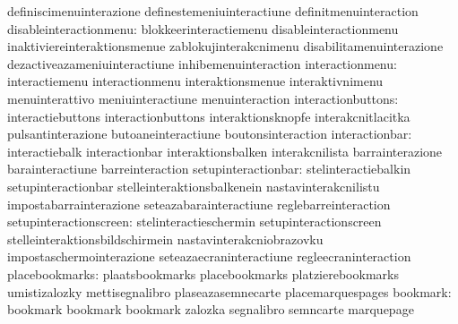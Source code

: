                                   definiscimenuinterazione         definestemeniuinteractiune
                                  definitmenuinteraction
          disableinteractionmenu: blokkeerinteractiemenu           disableinteractionmenu
                                  inaktiviereinteraktionsmenue     zablokujinterakcnimenu
                                  disabilitamenuinterazione        dezactiveazameniuinteractiune
                                  inhibemenuinteraction
                 interactionmenu: interactiemenu                   interactionmenu
                                  interaktionsmenue                interaktivnimenu
                                  menuinterattivo                  meniuinteractiune
                                  menuinteraction
              interactionbuttons: interactiebuttons                interactionbuttons
                                  interaktionsknopfe               interakcnitlacitka
                                  pulsantinterazione               butoaneinteractiune
                                  boutonsinteraction
                  interactionbar: interactiebalk                   interactionbar
                                  interaktionsbalken               interakcnilista
                                  barrainterazione                 barainteractiune
                                  barreinteraction
             setupinteractionbar: stelinteractiebalkin             setupinteractionbar
                                  stelleinteraktionsbalkenein      nastavinterakcnilistu
                                  impostabarrainterazione          seteazabarainteractiune
                                  reglebarreinteraction
          setupinteractionscreen: stelinteractieschermin           setupinteractionscreen
                                  stelleinteraktionsbildschirmein  nastavinterakcniobrazovku
                                  impostaschermointerazione        seteazaecraninteractiune
                                  regleecraninteraction
                  placebookmarks: plaatsbookmarks                  placebookmarks
                                  platzierebookmarks               umistizalozky
                                  mettisegnalibro                  plaseazasemnecarte
                                  placemarquespages
                        bookmark: bookmark                         bookmark
                                  bookmark                         zalozka
                                  segnalibro                       semncarte
                                  marquepage
